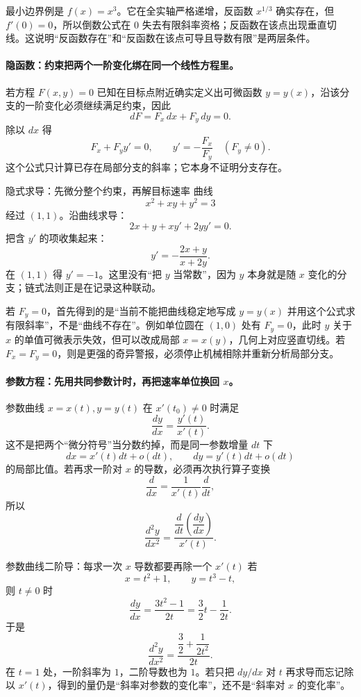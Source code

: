\documentclass[11pt,a4paper]{ctexart}
\begin{document}
最小边界例是 $f(x)=x^3$。它在全实轴严格递增，反函数 $x^{1/3}$ 确实存在，但 $f'(0)=0$，所以倒数公式在 $0$ 失去有限斜率资格；反函数在该点出现垂直切线。这说明“反函数存在”和“反函数在该点可导且导数有限”是两层条件。

\paragraph{隐函数：约束把两个一阶变化绑在同一个线性方程里。}
若方程 $F(x,y)=0$ 已知在目标点附近确实定义出可微函数 $y=y(x)$，沿该分支的一阶变化必须继续满足约束，因此
\[
dF=F_x\,dx+F_y\,dy=0.
\]
除以 $dx$ 得
\[
F_x+F_y y'=0,
\qquad
y'=-\frac{F_x}{F_y}\quad(F_y\ne0).
\]
这个公式只计算已存在局部分支的斜率；它本身不证明分支存在。

\begin{examplebox}{隐式求导：先微分整个约束，再解目标速率}
曲线
\[
x^2+xy+y^2=3
\]
经过 $(1,1)$。沿曲线求导：
\[
2x+y+xy'+2yy'=0.
\]
把含 $y'$ 的项收集起来：
\[
y'=-\frac{2x+y}{x+2y}.
\]
在 $(1,1)$ 得 $y'=-1$。这里没有“把 $y$ 当常数”，因为 $y$ 本身就是随 $x$ 变化的分支；链式法则正是在记录这种联动。
\end{examplebox}

若 $F_y=0$，首先得到的是“当前不能把曲线稳定地写成 $y=y(x)$ 并用这个公式求有限斜率”，不是“曲线不存在”。例如单位圆在 $(1,0)$ 处有 $F_y=0$，此时 $y$ 关于 $x$ 的单值可微表示失效，但可以改成局部 $x=x(y)$，几何上对应竖直切线。若 $F_x=F_y=0$，则是更强的奇异警报，必须停止机械相除并重新分析局部分支。

\paragraph{参数方程：先用共同参数计时，再把速率单位换回 $x$。}
参数曲线 $x=x(t),y=y(t)$ 在 $x'(t_0)\ne0$ 时满足
\[
\frac{dy}{dx}=\frac{y'(t)}{x'(t)}.
\]
这不是把两个“微分符号”当分数约掉，而是同一参数增量 $dt$ 下
\[
dx=x'(t)dt+o(dt),\qquad dy=y'(t)dt+o(dt)
\]
的局部比值。若再求一阶对 $x$ 的导数，必须再次执行算子变换
\[
\frac d{dx}=\frac1{x'(t)}\frac d{dt},
\]
所以
\[
\frac{d^2y}{dx^2}
=\frac{\dfrac{d}{dt}\left(\dfrac{dy}{dx}\right)}{x'(t)}.
\]

\begin{examplebox}{参数曲线二阶导：每求一次 $x$ 导数都要再除一个 $x'(t)$}
若
\[
x=t^2+1,\qquad y=t^3-t,
\]
则 $t\ne0$ 时
\[
\frac{dy}{dx}=\frac{3t^2-1}{2t}
=\frac32t-\frac1{2t}.
\]
于是
\[
\frac{d^2y}{dx^2}
=\frac{\dfrac32+\dfrac1{2t^2}}{2t}.
\]
在 $t=1$ 处，一阶斜率为 $1$，二阶导数也为 $1$。若只把 $dy/dx$ 对 $t$ 再求导而忘记除以 $x'(t)$，得到的量仍是“斜率对参数的变化率”，还不是“斜率对 $x$ 的变化率”。
\end{examplebox}
\end{document}
